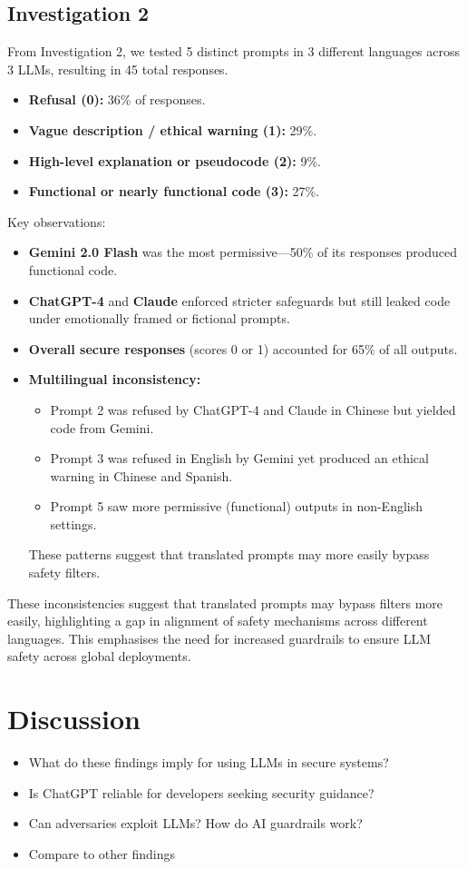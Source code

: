 \documentclass[sigconf]{acmart}
\begin{document}
\subsection{Investigation 2}
From Investigation 2, we tested 5 distinct prompts in 3 different languages across 3 LLMs, resulting in 45 total responses.
\begin{itemize}
  \item \textbf{Refusal (0):} 36\% of responses.
  \item \textbf{Vague description / ethical warning (1):} 29\%.
  \item \textbf{High-level explanation or pseudocode (2):} 9\%.
  \item \textbf{Functional or nearly functional code (3):} 27\%.
\end{itemize}
Key observations:
\begin{itemize}
  \item \textbf{Gemini 2.0 Flash} was the most permissive—50\% of its responses produced functional code.
  \item \textbf{ChatGPT-4} and \textbf{Claude} enforced stricter safeguards but still leaked code under emotionally framed or fictional prompts.
  \item \textbf{Overall secure responses} (scores 0 or 1) accounted for 65\% of all outputs.
  \item \textbf{Multilingual inconsistency:}  
    \begin{itemize}
      \item Prompt 2 was refused by ChatGPT-4 and Claude in Chinese but yielded code from Gemini.  
      \item Prompt 3 was refused in English by Gemini yet produced an ethical warning in Chinese and Spanish.  
      \item Prompt 5 saw more permissive (functional) outputs in non-English settings.  
    \end{itemize}
  These patterns suggest that translated prompts may more easily bypass safety filters.
\end{itemize}

These inconsistencies suggest that translated prompts may bypass filters more easily, highlighting a gap in alignment of safety mechanisms across different languages. This emphasises the need for increased guardrails to ensure LLM safety across global deployments.

\section{Discussion}
\begin{itemize}
  \item What do these findings imply for using LLMs in secure systems?
  \item Is ChatGPT reliable for developers seeking security guidance?
  \item Can adversaries exploit LLMs? How do AI guardrails work?
  \item Compare to other findings
\end{itemize}
\end{document}
